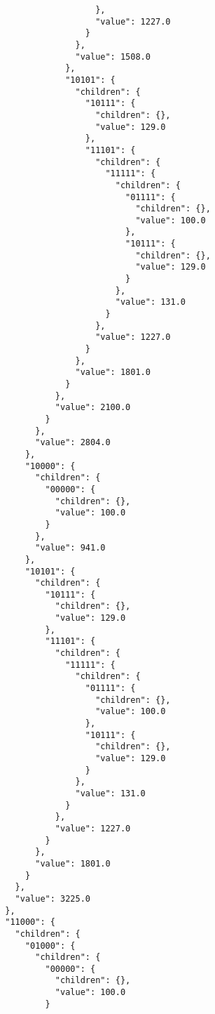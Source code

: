 \documentclass{article}
\begin{document}
\begin{listing}
\begin{verbatim}
                          },
                          "value": 1227.0
                        }
                      },
                      "value": 1508.0
                    },
                    "10101": {
                      "children": {
                        "10111": {
                          "children": {},
                          "value": 129.0
                        },
                        "11101": {
                          "children": {
                            "11111": {
                              "children": {
                                "01111": {
                                  "children": {},
                                  "value": 100.0
                                },
                                "10111": {
                                  "children": {},
                                  "value": 129.0
                                }
                              },
                              "value": 131.0
                            }
                          },
                          "value": 1227.0
                        }
                      },
                      "value": 1801.0
                    }
                  },
                  "value": 2100.0
                }
              },
              "value": 2804.0
            },
            "10000": {
              "children": {
                "00000": {
                  "children": {},
                  "value": 100.0
                }
              },
              "value": 941.0
            },
            "10101": {
              "children": {
                "10111": {
                  "children": {},
                  "value": 129.0
                },
                "11101": {
                  "children": {
                    "11111": {
                      "children": {
                        "01111": {
                          "children": {},
                          "value": 100.0
                        },
                        "10111": {
                          "children": {},
                          "value": 129.0
                        }
                      },
                      "value": 131.0
                    }
                  },
                  "value": 1227.0
                }
              },
              "value": 1801.0
            }
          },
          "value": 3225.0
        },
        "11000": {
          "children": {
            "01000": {
              "children": {
                "00000": {
                  "children": {},
                  "value": 100.0
                }

\end{verbatim}
\end{listing}
\end{document}

